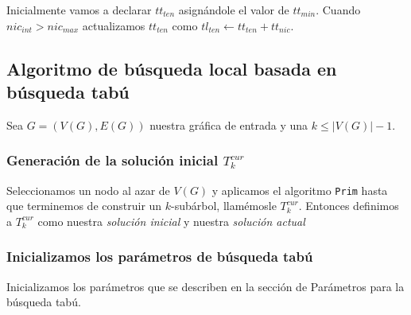\documentclass[letter,10pt]{article}
\theoremstyle{definition}
\begin{document}
Inicialmente vamos a declarar $tt_{ten}$ asignándole el valor de $tt_{min}$. Cuando $nic_{int} > nic_{max}$ actualizamos $tt_{ten}$ como $tl_{ten} \leftarrow tt_{ten} + tt_{nic}$.

\subsection{Algoritmo de búsqueda local basada en búsqueda tabú }

Sea $G=(V(G),E(G))$ nuestra gráfica de entrada y una $k\leq |V(G)|-1$.

\subsubsection{Generación de la solución inicial $T^{cur}_k$}
Seleccionamos un nodo al azar de $V(G)$ y aplicamos el algoritmo \texttt{Prim} hasta que terminemos de construir un $k$-subárbol, llamémosle $T^{cur}_k$. Entonces definimos a $T^{cur}_k$ como nuestra \textit{solución inicial} y nuestra \textit{solución actual}
\subsubsection{Inicializamos los parámetros de búsqueda tabú}
Inicializamos los parámetros que se describen en la sección de Parámetros para la búsqueda tabú.
\end{document}
